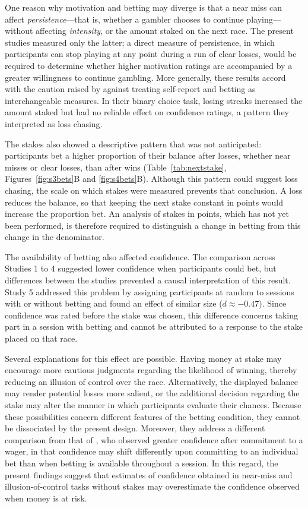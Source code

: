 \documentclass[man,floatsintext,donotrepeattitle]{apa7}
\begin{document}
One reason why motivation and betting may diverge is that a near miss can affect \emph{persistence}---that is, whether a gambler chooses to continue playing---without affecting \emph{intensity}, or the amount staked on the next race. The present studies measured only the latter; a direct measure of persistence, in which participants can stop playing at any point during a run of clear losses, would be required to determine whether higher motivation ratings are accompanied by a greater willingness to continue gambling. More generally, these results accord with the caution raised by \textcite{studer2015} against treating self-report and betting as interchangeable measures. In their binary choice task, losing streaks increased the amount staked but had no reliable effect on confidence ratings, a pattern they interpreted as loss chasing.

The stakes also showed a descriptive pattern that was not anticipated: participants bet a higher proportion of their balance after losses, whether near misses or clear losses, than after wins (Table~\ref{tab:nextstake}, Figures~\ref{fig:s3bets}B and \ref{fig:s4bets}B). Although this pattern could suggest loss chasing, the scale on which stakes were measured prevents that conclusion. A loss reduces the balance, so that keeping the next stake constant in points would increase the proportion bet. An analysis of stakes in points, which has not yet been performed, is therefore required to distinguish a change in betting from this change in the denominator.

The availability of betting also affected confidence. The comparison across Studies 1 to 4 suggested lower confidence when participants could bet, but differences between the studies prevented a causal interpretation of this result. Study 5 addressed this problem by assigning participants at random to sessions with or without betting and found an effect of similar size ($d \approx -0.47$). Since confidence was rated before the stake was chosen, this difference concerns taking part in a session with betting and cannot be attributed to a response to the stake placed on that race.

Several explanations for this effect are possible. Having money at stake may encourage more cautious judgments regarding the likelihood of winning, thereby reducing an illusion of control over the race. Alternatively, the displayed balance may render potential losses more salient, or the additional decision regarding the stake may alter the manner in which participants evaluate their chances. Because these possibilities concern different features of the betting condition, they cannot be dissociated by the present design. Moreover, they address a different comparison from that of \textcite{knoxinkster1968}, who observed greater confidence after commitment to a wager, in that confidence may shift differently upon committing to an individual bet than when betting is available throughout a session. In this regard, the present findings suggest that estimates of confidence obtained in near-miss and illusion-of-control tasks without stakes may overestimate the confidence observed when money is at risk.
\end{document}
